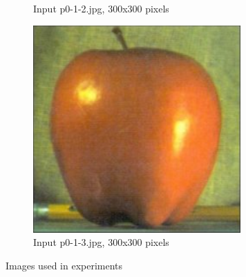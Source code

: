 \begin{figure}[h!]
\begin{subfigure}{0.5\textwidth}
  \caption{Input p0-1-2.jpg, 300x300 pixels}
\end{subfigure}%
\begin{subfigure}{0.5\textwidth}
  \centering
  \includegraphics[width=0.5\linewidth]{input/p1-1-3.png}
  \caption{Input p0-1-3.jpg, 300x300 pixels}
\end{subfigure}
 \caption{Images used in experiments}
\label{fig:Input-images}
\end{figure}


